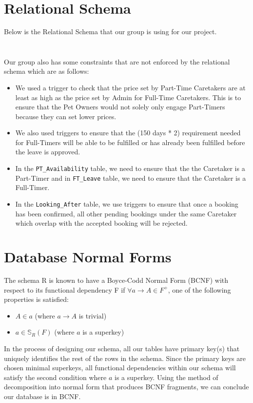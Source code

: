 \documentclass[10pt]{article}
\begin{document}
\newpage


\section{Relational Schema}
Below is the Relational Schema that our group is using for our project. 
\newline
\inputminted[breaklines, tabsize=8, obeytabs, fontsize=\footnotesize]{postgresql}{./codes/init_part1.sql}
\newpage
\inputminted[breaklines, tabsize=8, obeytabs, fontsize=\footnotesize]{postgresql}{./codes/init_part2.sql}

Our group also has some constraints that are not enforced by the relational schema which are as follows:
\begin{itemize}
    \item We used a trigger to check that the price set by Part-Time Caretakers are at least as high as the price set by Admin for Full-Time Caretakers. This is to ensure that the Pet Owners would not solely only engage Part-Timers because they can set lower prices.
    \item We also used triggers to ensure that the (150 days * 2) requirement needed for Full-Timers will be able to be fulfilled or has already been fulfilled before the leave is approved.
    \item In the \texttt{PT\_Availability} table, we need to ensure that the the Caretaker is a Part-Timer and in \texttt{FT\_Leave} table, we need to ensure that the Caretaker is a Full-Timer.
    \item In the \texttt{Looking\_After} table, we use triggers to ensure that once a booking has been confirmed, all other pending bookings under the same Caretaker which overlap with the accepted booking will be rejected. 
\end{itemize}


\section{Database Normal Forms}
The schema R is known to have a Boyce-Codd Normal Form (BCNF) with respect to its functional dependency F if \(\forall a \rightarrow A \in F^+\), one of the following properties is satisfied:
\begin{itemize}
    \item \(A \in a\) (where \(a \rightarrow A\) is trivial)
    \item \(a \in \mathbb{S}_R(F)\) (where \(a\) is a superkey) 
\end{itemize}
In the process of designing our schema, all our tables have primary key(s) that uniquely identifies the rest of the rows in the schema. Since the primary keys are chosen minimal superkeys, all functional dependencies within our schema will satisfy the second condition where $a$ is a superkey. Using the method of decomposition into normal form that produces BCNF fragments, we can conclude our database is in BCNF.
\end{document}
